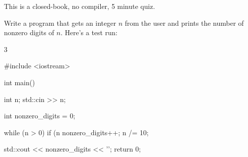 

This is a closed-book, no compiler, 5 minute quiz.

\nextq
Write a program that gets an integer $n$ from the user
and prints the number of nonzero digits of $n$.
Here's a test run:
\begin{console}[fontsize=\small,commandchars=\\\{\}]
3
\end{console}
\ANSWER
\begin{answercode}
#include <iostream>

int main()
{
    int n;
    std::cin >> n;

    int nonzero_digits = 0;

    while (n > 0)
    {
        if (n %
        {
            nonzero_digits++;
        }
        n /= 10; 
    }

    std::cout << nonzero_digits << '\n'; 
    return 0;
}
\end{answercode}


